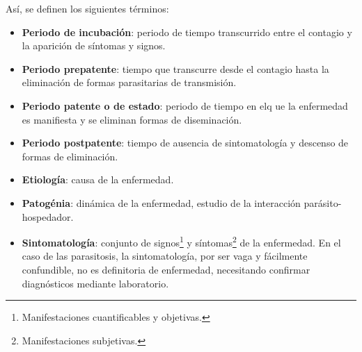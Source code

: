 Así, se definen los siguientes términos:
\begin{itemize}[itemsep=0pt,parsep=0pt,topsep=0pt,partopsep=0pt]
	\item \textbf{Periodo de incubación}: periodo de tiempo transcurrido entre el contagio y la aparición de síntomas y signos.
	\item\textbf{Periodo prepatente}: tiempo que transcurre desde el contagio hasta la eliminación de formas parasitarias de transmisión.
	\item\textbf{Periodo patente o de estado}: periodo de tiempo en elq ue la enfermedad es manifiesta y se eliminan formas de diseminación.
	\item\textbf{Periodo postpatente}: tiempo de ausencia de sintomatología y descenso de formas de eliminación.
	\item\textbf{Etiología}: causa de la enfermedad.
	\item\textbf{Patogénia}: dinámica de la enfermedad, estudio de la interacción parásito-hospedador.
	\item\textbf{Sintomatología}: conjunto de signos\footnote{Manifestaciones cuantificables y objetivas.} y síntomas\footnote{Manifestaciones subjetivas.} de la enfermedad. En el caso de las parasitosis, la sintomatología, por ser vaga y fácilmente confundible, no es definitoria de enfermedad, necesitando confirmar diagnósticos mediante laboratorio.
\end{itemize}

